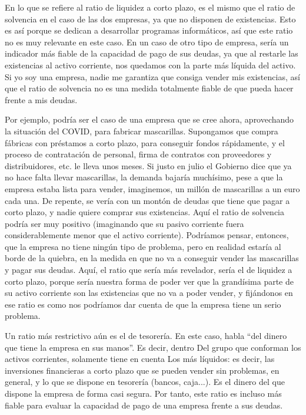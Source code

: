 \documentclass[a4paper]{article}
\begin{document}
En lo que se refiere al ratio de liquidez a corto plazo, es el mismo que el ratio de solvencia en el caso de las dos empresas, ya que no disponen de existencias. Esto es así porque se dedican a desarrollar programas informáticos, así que este ratio no es muy relevante en este caso. En un caso de otro tipo de empresa, sería un indicador más fiable de la capacidad de pago de sus deudas, ya que al restarle las existencias al activo corriente, nos quedamos con la parte más líquida del activo. Si yo soy una empresa, nadie me garantiza que consiga vender mis existencias, así que el ratio de solvencia no es una medida totalmente fiable de que pueda hacer frente a mis deudas.

Por ejemplo, podría ser el caso de una empresa que se cree ahora, aprovechando la situación del COVID, para fabricar mascarillas. Supongamos que compra fábricas con préstamos a corto plazo, para conseguir fondos rápidamente, y el proceso de contratación de personal, firma de contratos con proveedores y distribuidores, etc. le lleva unos meses. Si justo en julio el Gobierno dice que ya no hace falta llevar mascarillas, la demanda bajaría muchísimo, pese a que la empresa estaba lista para vender, imaginemos, un millón de mascarillas a un euro cada una. De repente, se vería con un montón de deudas que tiene que pagar a corto plazo, y nadie quiere comprar sus existencias. Aquí el ratio de solvencia podría ser muy positivo (imaginando que su pasivo corriente fuera considerablemente menor que el activo corriente). Podríamos pensar, entonces, que la empresa no tiene ningún tipo de problema, pero en realidad estaría al borde de la quiebra, en la medida en que no va a conseguir vender las mascarillas y pagar sus deudas. Aquí, el ratio que sería más revelador, sería el de liquidez a corto plazo, porque sería nuestra forma de poder ver que la grandísima parte de su activo corriente son las existencias que no va a poder vender, y fijándonos en ese ratio es como nos podríamos dar cuenta de que la empresa tiene un serio problema.

Un ratio más restrictivo aún es el de tesorería. En este caso, habla ``del dinero que tiene la empresa en sus manos''. Es decir, dentro Del grupo que conforman los activos corrientes, solamente tiene en cuenta Los más líquidos: es decir, las inversiones financieras a corto plazo que se pueden vender sin problemas, en general, y lo que se dispone en tesorería (bancos, caja...). Es el dinero del que dispone la empresa de forma casi segura. Por tanto, este ratio es incluso más fiable para evaluar la capacidad de pago de una empresa frente a sus deudas.
\end{document}
